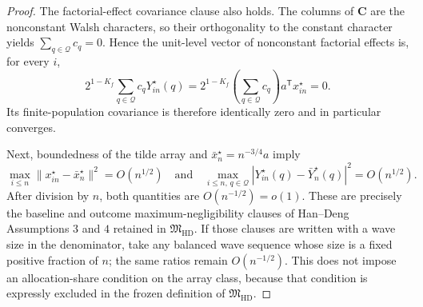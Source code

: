 \documentclass{article}
\begin{document}
\begin{proof}
The factorial-effect covariance clause also holds.  The columns of
\(\mathbf C\) are the nonconstant Walsh characters, so their orthogonality
to the constant character yields \(\sum_{q\in\mathcal Q}c_q=0\).  Hence the
unit-level vector of nonconstant factorial effects is, for every \(i\),
\[
2^{1-K_f}\sum_{q\in\mathcal Q}c_qY_{in}^{\star}(q)
=2^{1-K_f}\left(\sum_{q\in\mathcal Q}c_q\right)
  a^{\mathsf T}x_{in}^{\star}=0.
\]
Its finite-population covariance is therefore identically zero and in
particular converges.

Next, boundedness of the tilde array and
\(\bar x_n^{\star}=n^{-3/4}a\) imply
\[
\max_{i\le n}\lVert x_{in}^{\star}-\bar x_n^{\star}\rVert^2
=O(n^{1/2})
\quad\text{and}\quad
\max_{i\le n,\,q\in\mathcal Q}
 |Y_{in}^{\star}(q)-\bar Y_n^{\star}(q)|^2=O(n^{1/2}).
\]
After division by \(n\), both quantities are \(O(n^{-1/2})=o(1)\).
These are precisely the baseline and outcome maximum-negligibility clauses
of Han--Deng Assumptions \(3\) and \(4\) retained in
\(\mathfrak M_{\mathrm{HD}}\).  If those clauses are written with a wave
size in the denominator, take any balanced wave sequence whose size is a
fixed positive fraction of \(n\); the same ratios remain
\(O(n^{-1/2})\).  This does not impose an allocation-share condition on the
array class, because that condition is expressly excluded in the frozen
definition of \(\mathfrak M_{\mathrm{HD}}\).


\end{proof}
\end{document}
